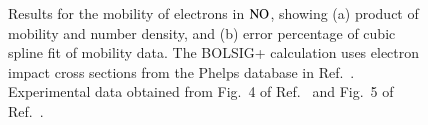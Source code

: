 \documentclass{warpdoc}
\let\citen\cite
\begin{document}
%
\begin{figure}
\centering
{}
\caption{Results for the mobility of electrons in ${\rm NO}$, showing (a) product of mobility and number density, and (b) error percentage of cubic spline fit of  mobility data. The BOLSIG+ calculation uses electron impact cross sections from the Phelps database in Ref.\ \citen{jcp:2012:morgan}. Experimental data obtained from Fig.\ 4 of Ref.\ \citen{jos:1934:bailey} and Fig.\ 5 of Ref.\ \citen{jcs:1972:parkes}.}
\label{fig:mobility_NO}
\end{figure}
\end{document}
